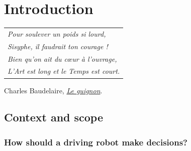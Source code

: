
\graphicspath{{2-Chapters/1-Chapter/}}

\chapter{Introduction}
\label{chapter:1}

\begin{flushright}
	\begin{tabular}{@{}l@{}}
		\emph{Pour soulever un poids si lourd,}\\
		\emph{Sisyphe, il faudrait ton courage !}\\
		\emph{Bien qu’on ait du cœur à l’ouvrage,}\\
		\emph{L’Art est long et le Temps est court.}\\
	\end{tabular}

	Charles Baudelaire, \href{https://eleurent.github.io/sisyphe/texts/le-guignon.html}{\emph{Le guignon}}.
\end{flushright}

\section{Context and scope}


\subsection{How should a driving robot make decisions?}
\label{sec:trolley}

